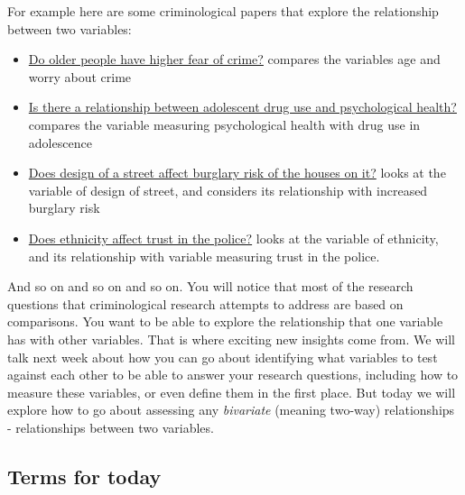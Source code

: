 \documentclass[]{book}
\providecommand{\tightlist}{%
  \setlength{\itemsep}{0pt}\setlength{\parskip}{0pt}}
\theoremstyle{definition}
\theoremstyle{definition}
\theoremstyle{definition}
\theoremstyle{remark}
\begin{document}
For example here are some criminological papers that explore the
relationship between two variables:

\begin{itemize}
\tightlist
\item
  \href{http://onlinelibrary.wiley.com/doi/10.1111/j.1745-9125.1989.tb01051.x/full}{Do
  older people have higher fear of crime?} compares the variables age
  and worry about crime
\item
  \href{http://psycnet.apa.org/record/1990-22928-001}{Is there a
  relationship between adolescent drug use and psychological health?}
  compares the variable measuring psychological health with drug use in
  adolescence
\item
  \href{https://link.springer.com/article/10.1007/s10940-009-9084-8}{Does
  design of a street affect burglary risk of the houses on it?} looks at
  the variable of design of street, and considers its relationship with
  increased burglary risk
\item
  \href{http://journals.sagepub.com/doi/abs/10.1177/1098611104271105}{Does
  ethnicity affect trust in the police?} looks at the variable of
  ethnicity, and its relationship with variable measuring trust in the
  police.
\end{itemize}

And so on and so on and so on. You will notice that most of the research
questions that criminological research attempts to address are based on
comparisons. You want to be able to explore the relationship that one
variable has with other variables. That is where exciting new insights
come from. We will talk next week about how you can go about identifying
what variables to test against each other to be able to answer your
research questions, including how to measure these variables, or even
define them in the first place. But today we will explore how to go
about assessing any \emph{bivariate} (meaning two-way) relationships -
relationships between two variables.

\hypertarget{terms-for-today-1}{%
\subsection{Terms for today}\label{terms-for-today-1}}
\end{document}

